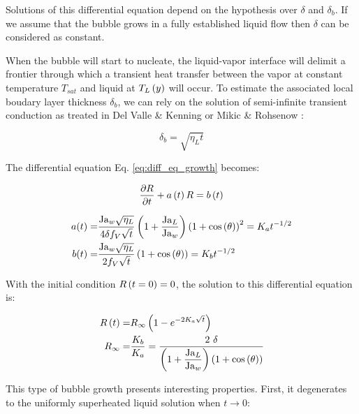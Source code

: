 \npar

Solutions of this differential equation depend on the hypothesis over $\delta$ and $\delta_{b}$. If we assume that the bubble grows in a fully established liquid flow then $\delta$ can be considered as constant.

When the bubble will start to nucleate, the liquid-vapor interface will delimit a frontier through which a transient heat transfer between the vapor at constant temperature $T_{sat}$ and liquid at $T_{L}\left( y \right)$ will occur. To estimate the associated local boudary layer thickness $\delta_{b}$, we can rely on the solution of semi-infinite transient conduction as treated in Del Valle \& Kenning \cite{del_valle_subcooled_1985} or Mikic \& Rohsenow \cite{mikic_bubble_1970}:

\begin{equation}
\delta_{b} = \sqrt{\eta_{L}t}
\label{eq:TBL_expgrowth}
\end{equation}

\npar

The differential equation Eq. \ref{eq:diff_eq_growth} becomes:

\begin{align}
\frac{\partial{R}}{\partial t}+a\left( t \right)R=b\left( t \right)
\end{align}

\begin{align}
a(t)=&\frac{\mathrm{Ja}_{w}\sqrt{\eta_{L}}}{4\delta f_{V}\sqrt{t}}\left( 1+\frac{\mathrm{Ja}_{L}}{\mathrm{Ja}_{w}} \right)\left( 1+\mathrm{cos}\left( \theta \right) \right)^{2}=K_{a}t^{-1/2} \\
b(t)=&\frac{\mathrm{Ja}_{w}\sqrt{\eta_{L}}}{2f_{V} \sqrt{t}}\left( 1+\mathrm{cos}\left( \theta \right) \right)=K_ {b}t^{-1/2}
\label{eq:coeff_expgrowth}
\end{align}

\npar

With the initial condition $R\left( t=0 \right)=0$, the solution to this differential equation is: 

\begin{align}
R\parth{t}=&R_{\infty}\parth{1-e^{-2K_{a}\sqrt{t}}}
\label{eq:exp_growth} \\
R_{\infty}=&\frac{K_{b}}{K_{a}} = \frac{2\ \delta}{\parth{1+\dfrac{\Ja_{L}}{\Ja_{w}} } \parth{1+\cos{\theta} } }
\label{eq:eq_radius_expgrowth}
\end{align}

\npar

This type of bubble growth presents interesting properties. First, it degenerates to the uniformly superheated liquid solution when $t \to 0$:

